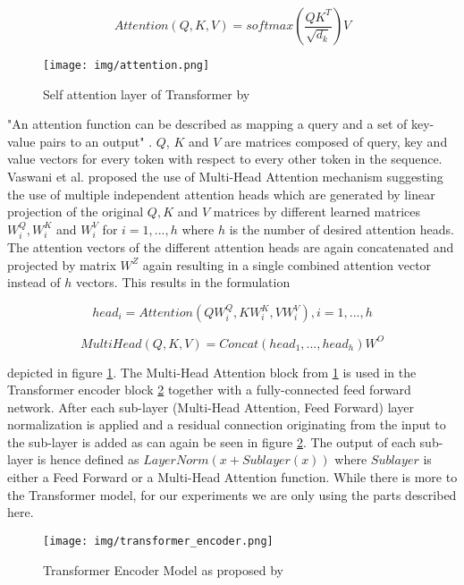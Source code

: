 \begin{equation}
	Attention(Q,K,V) = softmax(\frac{QK^T}{\sqrt{d_k}})V
\end{equation}

\begin{figure}[h]
	\centering
	\texttt{[image: img/attention.png]}
	\caption{Self attention layer of Transformer by \cite{attention_origin}}
	\label{fig:attention}
\end{figure}

"An attention function can be described as mapping a query and a set of key-value pairs to an output" \cite{attention_origin}. $Q$, $K$ and $V$ are matrices composed of query, key and value vectors for every token with respect to every other token in the sequence.
Vaswani et al. proposed the use of Multi-Head Attention mechanism suggesting the use of multiple independent attention heads which are generated by linear projection of the original $Q, K$ and $V$ matrices by different learned matrices $W^Q_i, W^K_i$ and $W^V_i$ for $i = 1, ... ,h$ where $h$ is the number of desired attention heads. The attention vectors of the different attention heads are again concatenated and projected by matrix $W^Z$ again resulting in a single combined attention vector instead of $h$ vectors. This results in the formulation 

\begin{equation}
	head_i = Attention(QW^Q_i, KW^K_i, VW^V_i), i = 1, ..., h
\end{equation}

\begin{equation}
	MultiHead(Q,K,V) = Concat(head_1, ..., head_h)W^O
\end{equation}

depicted in figure \ref{fig:attention}. The Multi-Head Attention block from \ref{fig:attention} is
used in the Transformer encoder block \ref{fig:transformer_encoder} together with a fully-connected feed forward network. After each sub-layer (Multi-Head Attention, Feed Forward) layer normalization is applied and a residual connection originating from the input to the sub-layer is added as can again be seen in figure \ref{fig:transformer_encoder}. The output of each sub-layer is hence defined as $LayerNorm(x + Sublayer(x))$ where $Sublayer$ is either a Feed Forward or a Multi-Head Attention function. While there is more to the Transformer model, for our experiments we are only using the parts described here.


\begin{figure}[h]
	\centering
	\texttt{[image: img/transformer\_encoder.png]}
	\caption{Transformer Encoder Model as proposed by \cite{attention_origin}}
	\label{fig:transformer_encoder}
\end{figure}

